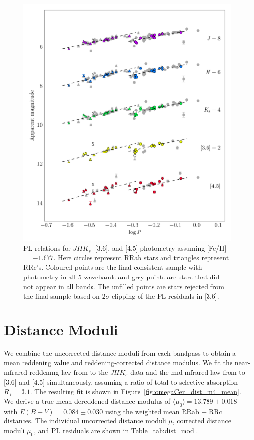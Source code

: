 \documentclass[a4paper,fleqn,usenatbib]{mnras}
\begin{document}
\begin{figure}
\begin{center}
\includegraphics[width=160mm]{reworked_fitting_code/final_plots/multiwavelength_PL_m4_clipped.pdf}
\caption{PL relations for $J\!H\!K_s$, [3.6], and [4.5] photometry assuming [Fe/H]$=-1.677$. Here circles represent RRab stars and triangles represent RRc's. Coloured points are the final consistent sample with photometry in all 5 wavebands and grey points are stars that did not appear in all bands. The unfilled points are stars rejected from the final sample based on $2\sigma$ clipping of the PL residuals in [3.6].}
\label{fig:omegaCen_pl_m4}
\end{center}
\end{figure}


\section{Distance Moduli}
\label{sec:distance_moduli}

We combine the uncorrected distance moduli from each bandpass to obtain a mean reddening value and reddening-corrected distance modulus. We fit the near-infrared reddening law from \citet{1989ApJ...345..245C} to the $JHK_s$ data and the mid-infrared law from \citet{2005ApJ...619..931I} to [3.6] and [4.5] simultaneously, assuming a ratio of total to selective absorption $R_V = 3.1$. The resulting fit is shown in Figure~\ref{fig:omegaCen_dist_m4_mean}. We derive a true mean dereddened distance modulus of $\langle \mu_0 \rangle = 13.789 \pm 0.018$ with $E(B-V) = 0.084 \pm 0.030$ using the weighted mean RRab + RRc distances. The individual uncorrected distance moduli $\mu$, corrected distance moduli $\mu_0$, and PL residuals are shown in Table~\ref{tab:dist_mod}.
\end{document}
